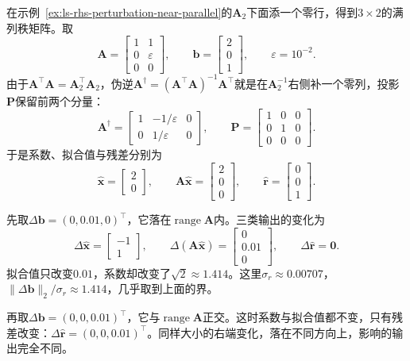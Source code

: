 \begin{example}[三类输出的不同变化]
\label{ex:ls-three-outputs-sensitivity}
在示例~\ref{ex:ls-rhs-perturbation-near-parallel}的$\bm A_2$下面添一个零行，得到$3\times2$的满列秩矩阵。取
\[
 \bm A=\begin{bmatrix}1&1\\0&\varepsilon\\0&0\end{bmatrix},\qquad
 \bm b=\begin{bmatrix}2\\0\\1\end{bmatrix},\qquad \varepsilon=10^{-2}.
\]
由于$\bm A^\top\bm A=\bm A_2^\top\bm A_2$，伪逆$\bm A^\dagger=(\bm A^\top\bm A)^{-1}\bm A^\top$就是在$\bm A_2^{-1}$右侧补一个零列，投影$\bm P$保留前两个分量：
\[
 \bm A^\dagger=\begin{bmatrix}1&-1/\varepsilon&0\\0&1/\varepsilon&0\end{bmatrix},\qquad
 \bm P=\begin{bmatrix}1&0&0\\0&1&0\\0&0&0\end{bmatrix}.
\]
于是系数、拟合值与残差分别为
\[
 \hat{\bm x}=\begin{bmatrix}2\\0\end{bmatrix},\qquad
 \bm A\hat{\bm x}=\begin{bmatrix}2\\0\\0\end{bmatrix},\qquad
 \hat{\bm r}=\begin{bmatrix}0\\0\\1\end{bmatrix}.
\]

先取$\Delta\bm b=(0,0.01,0)^\top$，它落在$\operatorname{range}\bm A$内。三类输出的变化为
\[
 \Delta\hat{\bm x}=\begin{bmatrix}-1\\1\end{bmatrix},\qquad
 \Delta(\bm A\hat{\bm x})=\begin{bmatrix}0\\0.01\\0\end{bmatrix},\qquad
 \Delta\hat{\bm r}=\bm0 .
\]
拟合值只改变$0.01$，系数却改变了$\sqrt2\approx1.414$。这里$\sigma_r\approx0.00707$，$\lVert\Delta\bm b\rVert_2/\sigma_r\approx1.414$，几乎取到上面的界。

再取$\Delta\bm b=(0,0,0.01)^\top$，它与$\operatorname{range}\bm A$正交。这时系数与拟合值都不变，只有残差改变：$\Delta\hat{\bm r}=(0,0,0.01)^\top$。同样大小的右端变化，落在不同方向上，影响的输出完全不同。
\end{example}

